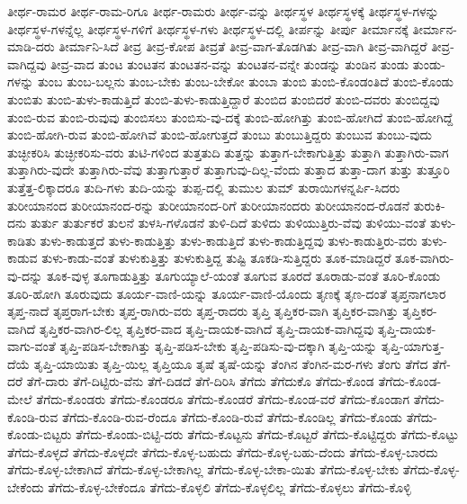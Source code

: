 {ತೀರ್ಥ-ರಾಮರ
ತೀರ್ಥ-ರಾಮ-ರಿಗೂ
ತೀರ್ಥ-ರಾಮರು
ತೀರ್ಥ-ವನ್ನು
ತೀರ್ಥಸ್ಥಳ
ತೀರ್ಥಸ್ಥಳಕ್ಕೆ
ತೀರ್ಥಸ್ಥಳ-ಗಳನ್ನು
ತೀರ್ಥಸ್ಥಳ-ಗಳನ್ನೆಲ್ಲ
ತೀರ್ಥಸ್ಥಳ-ಗಳಿಗೆ
ತೀರ್ಥಸ್ಥಳ-ಗಳು
ತೀರ್ಥಸ್ಥಳ-ದಲ್ಲಿ
ತೀರ್ಪನ್ನು
ತೀರ್ಪು
ತೀರ್ಮಾನಕ್ಕೆ
ತೀರ್ಮಾನ-ಮಾಡಿ-ದರು
ತೀರ್ಮಾನಿ-ಸಿದೆ
ತೀವ್ರ
ತೀವ್ರ-ಕೋಪ
ತೀವ್ರತೆ
ತೀವ್ರ-ವಾಗ-ತೊಡಗಿತು
ತೀವ್ರ-ವಾಗಿ
ತೀವ್ರ-ವಾಗಿದ್ದರೆ
ತೀವ್ರ-ವಾಗಿದ್ದವು
ತೀವ್ರ-ವಾದ
ತುಂಟ
ತುಂಟತನ
ತುಂಟತನ-ವನ್ನು
ತುಂಟತನ-ವನ್ನೇ
ತುಂಡನ್ನು
ತುಂಡಿನ
ತುಂಡು
ತುಂಡು-ಗಳನ್ನು
ತುಂಬ
ತುಂಬ-ಬಲ್ಲನು
ತುಂಬ-ಬೇಕು
ತುಂಬ-ಬೇಕೋ
ತುಂಬಾ
ತುಂಬಿ
ತುಂಬಿ-ಕೊಂಡಂತಿದೆ
ತುಂಬಿ-ಕೊಂಡು
ತುಂಬಿತು
ತುಂಬಿ-ತುಳು-ಕಾಡುತ್ತಿದೆ
ತುಂಬಿ-ತುಳು-ಕಾಡುತ್ತಿದ್ದಾರೆ
ತುಂಬಿದ
ತುಂಬಿದರೆ
ತುಂಬಿ-ದವರು
ತುಂಬಿದ್ದವು
ತುಂಬಿ-ರುವ
ತುಂಬಿ-ರುವುವು
ತುಂಬಿಸಲು
ತುಂಬಿಸು-ವು-ದಕ್ಕೆ
ತುಂಬಿ-ಹೋಗಿತ್ತು
ತುಂಬಿ-ಹೋಗಿದೆ
ತುಂಬಿ-ಹೋಗಿದ್ದೆ
ತುಂಬಿ-ಹೋಗಿ-ರುವ
ತುಂಬಿ-ಹೋಗಿವೆ
ತುಂಬಿ-ಹೋಗುತ್ತದೆ
ತುಂಬು
ತುಂಬುತ್ತಿದ್ದರು
ತುಂಬುವ
ತುಂಬು-ವುದು
ತುಚ್ಛೀಕರಿಸಿ
ತುಚ್ಛೀಕರಿಸು-ವರು
ತುಟಿ-ಗಳಿಂದ
ತುತ್ತತುದಿ
ತುತ್ತನ್ನು
ತುತ್ತಾಗ-ಬೇಕಾಗುತ್ತಿತ್ತು
ತುತ್ತಾಗಿ
ತುತ್ತಾಗಿರು-ವಾಗ
ತುತ್ತಾಗಿರು-ವುದೇ
ತುತ್ತಾಗಿರು-ವೆವು
ತುತ್ತಾಗುತ್ತಾರೆ
ತುತ್ತಾಗುವು-ದಿಲ್ಲ-ವೆಂದು
ತುತ್ತಾದ
ತುತ್ತಾ-ದಾಗ
ತುತ್ತು
ತುತ್ತೂರಿ
ತುತ್ತೆತ್ತ-ಲಿಕ್ಕಾದರೂ
ತುದಿ-ಗಳು
ತುದಿ-ಯನ್ನು
ತುಪ್ಪ-ದಲ್ಲಿ
ತುಮುಲ
ತುಮ್
ತುರಾಯಿಗಳನ್ನರ್ಪಿ-ಸಿದರು
ತುರೀಯಾನಂದ
ತುರೀಯಾನಂದ-ರನ್ನು
ತುರೀಯಾನಂದ-ರಿಗೆ
ತುರೀಯಾನಂದರು
ತುರೀಯಾನಂದ-ರೊಡನೆ
ತುರುಕಿ-ದನು
ತುರ್ತು
ತುರ್ತುಕರೆ
ತುಲನೆ
ತುಳಸಿ-ಗಳೊಡನೆ
ತುಳಿ-ದಿದೆ
ತುಳಿದು
ತುಳಿಯುತ್ತಿರು-ವೆವು
ತುಳಿಯು-ವಂತೆ
ತುಳು-ಕಾಡಿತು
ತುಳು-ಕಾಡುತ್ತದೆ
ತುಳು-ಕಾಡುತ್ತಿತ್ತು
ತುಳು-ಕಾಡುತ್ತಿದೆ
ತುಳು-ಕಾಡುತ್ತಿದ್ದವು
ತುಳು-ಕಾಡುತ್ತಿರು-ವರು
ತುಳು-ಕಾಡುವ
ತುಳು-ಕಾಡು-ವಂತೆ
ತುಳುಕುತ್ತಿತ್ತು
ತುಳುಕುತ್ತಿದ್ದ
ತುಷ್ಟಿ
ತೂಕಡಿ-ಸುತ್ತಿದ್ದರು
ತೂಕ-ಮಾಡಿದ್ದರೆ
ತೂಕ-ವಾಗಿರು-ವು-ದನ್ನು
ತೂಕ-ವುಳ್ಳ
ತೂಗಾಡುತ್ತಿತ್ತು
ತೂಗುಯ್ಯಾಲೆ-ಯಂತೆ
ತೂಗುವ
ತೂರದೆ
ತೂರಾಡು-ವಂತೆ
ತೂರಿ-ಕೊಂಡು
ತೂರಿ-ಹೋಗಿ
ತೂರುವುದು
ತೂರ್ಯ-ವಾಣಿ-ಯನ್ನು
ತೂರ್ಯ-ವಾಣಿ-ಯೊಂದು
ತೃಣಕ್ಕೆ
ತೃಣ-ದಂತೆ
ತೃಪ್ತನಾಗಲಾರ
ತೃಪ್ತ-ನಾದೆ
ತೃಪ್ತರಾಗ-ಬೇಕು
ತೃಪ್ತ-ರಾಗಿರು-ವರು
ತೃಪ್ತ-ರಾದರು
ತೃಪ್ತಿ
ತೃಪ್ತಿಕರ-ವಾಗಿ
ತೃಪ್ತಿಕರ-ವಾಗಿತ್ತು
ತೃಪ್ತಿಕರ-ವಾಗಿದೆ
ತೃಪ್ತಿಕರ-ವಾಗಿರ-ಲಿಲ್ಲ
ತೃಪ್ತಿಕರ-ವಾದ
ತೃಪ್ತಿ-ದಾಯಕ-ವಾಗಿದೆ
ತೃಪ್ತಿ-ದಾಯಕ-ವಾಗಿದ್ದವು
ತೃಪ್ತಿ-ದಾಯಕ-ವಾಗು-ವಂತೆ
ತೃಪ್ತಿ-ಪಡಿಸ-ಬೇಕಾಗಿತ್ತು
ತೃಪ್ತಿ-ಪಡಿಸ-ಬೇಕು
ತೃಪ್ತಿ-ಪಡಿಸು-ವು-ದಕ್ಕಾಗಿ
ತೃಪ್ತಿ-ಯನ್ನು
ತೃಪ್ತಿ-ಯಾಗುತ್ತ-ದೆಯೆ
ತೃಪ್ತಿ-ಯಾಯಿತು
ತೃಪ್ತಿ-ಯಿಲ್ಲ
ತೃಪ್ತಿಯೂ
ತೃಷೆ
ತೃಷೆ-ಯನ್ನು
ತೆಂಗಿನ
ತೆಂಗಿನ-ಮರ-ಗಳು
ತೆಂಗು
ತೆಗೆದ
ತೆಗೆ-ದರೆ
ತೆಗೆ-ದಾರು
ತೆಗೆ-ದಿಟ್ಟಿರು-ವೆನು
ತೆಗೆ-ದಿಡದೆ
ತೆಗೆ-ದಿರಿಸಿ
ತೆಗೆದು
ತೆಗೆದುಕೊ
ತೆಗೆದು-ಕೊಂಡ
ತೆಗೆದು-ಕೊಂಡ-ಮೇಲೆ
ತೆಗೆದು-ಕೊಂಡರು
ತೆಗೆದು-ಕೊಂಡರೂ
ತೆಗೆದು-ಕೊಂಡರೆ
ತೆಗೆದು-ಕೊಂಡ-ವರೆ
ತೆಗೆದು-ಕೊಂಡಾಗ
ತೆಗೆದು-ಕೊಂಡಿ-ರುವ
ತೆಗೆದು-ಕೊಂಡಿ-ರುವ-ರೆಂದೂ
ತೆಗೆದು-ಕೊಂಡಿ-ರುವೆ
ತೆಗೆದು-ಕೊಂಡಿಲ್ಲ
ತೆಗೆದು-ಕೊಂಡು
ತೆಗೆದು-ಕೊಂಡು-ಬಿಟ್ಟರು
ತೆಗೆದು-ಕೊಂಡು-ಬಿಟ್ಟಿ-ದರು
ತೆಗೆದು-ಕೊಟ್ಟನು
ತೆಗೆದು-ಕೊಟ್ಟರೆ
ತೆಗೆದು-ಕೊಟ್ಟಿದ್ದರು
ತೆಗೆದು-ಕೊಟ್ಟು
ತೆಗೆದು-ಕೊಳ್ಳದೆ
ತೆಗೆದು-ಕೊಳ್ಳದೇ
ತೆಗೆದು-ಕೊಳ್ಳ-ಬಹುದು
ತೆಗೆದು-ಕೊಳ್ಳ-ಬಹು-ದೆಂದು
ತೆಗೆದು-ಕೊಳ್ಳ-ಬಾರದು
ತೆಗೆದು-ಕೊಳ್ಳ-ಬೇಕಾಗಿದೆ
ತೆಗೆದು-ಕೊಳ್ಳ-ಬೇಕಾಗಿಲ್ಲ
ತೆಗೆದು-ಕೊಳ್ಳ-ಬೇಕಾ-ಯಿತು
ತೆಗೆದು-ಕೊಳ್ಳ-ಬೇಕು
ತೆಗೆದು-ಕೊಳ್ಳ-ಬೇಕೆಂದು
ತೆಗೆದು-ಕೊಳ್ಳ-ಬೇಕೆಂದೂ
ತೆಗೆದು-ಕೊಳ್ಳಲಿ
ತೆಗೆದು-ಕೊಳ್ಳಲಿಲ್ಲ
ತೆಗೆದು-ಕೊಳ್ಳಲು
ತೆಗೆದು-ಕೊಳ್ಳಿ
}
